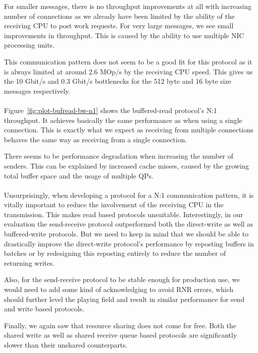For smaller messages, there is no throughput improvements at all with increasing number of connections as we already have 
been limited by the ability of the receiving CPU to post work requests. For very large messages, we see small improvements
in throughput. This is caused by the ability to use multiple NIC processing units.

This communication pattern does not seem to be a good fit for this protocol as it is always limited at around 
2.6 MOp/s by the receiving CPU speed. This gives us the 10 Gbit/s and 0.3 Gbit/s bottlenecks for the 512 byte and
16 byte size messages respectively.

\paragraph{} Figure~\ref{fig:plot-bufread-bw-n1} shows the buffered-read protocol's N:1 throughput. It 
achieves basically the 
same performance as when using a single connection. This is exactly what we expect as receiving from multiple connections
behaves the same way as receiving from a single connection.

There seems to be performance degradation when increasing the number of senders. This can  be explained
by increased cache misses, caused by the growing total buffer space and the usage of multiple QPs.


\paragraph{} Unsurprisingly, when developing a protocol for a N:1 communication pattern, it is vitally important to reduce the 
involvement of the receiving CPU in the transmission. This makes read based protocols unsuitable. Interestingly, in our
evaluation the send-receive protocol outperformed both the direct-write as well as buffered-write protocols. But we need to 
keep in mind that we should be able to drastically improve the direct-write protocol's performance by reposting
buffers in batches or by redesigning this reposting entirely to reduce the number of returning writes.

Also, for the send-receive protocol to be stable enough for production use, we would need to add some kind of acknowledging to
avoid RNR errors, which should further level the playing field and result in similar performance for send and write based 
protocols.

Finally, we again saw that resource sharing does not come for free. Both the shared write as well as shared receive queue based
protocols are significantly slower than their unshared counterparts. 








